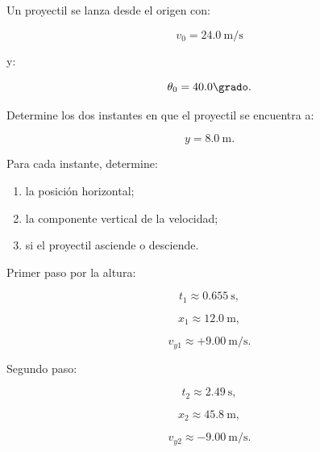 \begin{ejercicio}
Un proyectil se lanza desde el origen con:

\[
v_0=\SI{24.0}{\meter\per\second}
\]

y:

\[
\theta_0=40.0\grado.
\]

Determine los dos instantes en que el proyectil se encuentra a:

\[
y=\SI{8.0}{\meter}.
\]

Para cada instante, determine:

\begin{enumerate}[label=\alph*)]
    \item la posición horizontal;
    \item la componente vertical de la velocidad;
    \item si el proyectil asciende o desciende.
\end{enumerate}
\end{ejercicio}

\begin{respuesta}
Primer paso por la altura:

\[
t_1\approx\SI{0.655}{\second},
\]

\[
x_1\approx\SI{12.0}{\meter},
\]

\[
v_{y1}\approx+\SI{9.00}{\meter\per\second}.
\]

Segundo paso:

\[
t_2\approx\SI{2.49}{\second},
\]

\[
x_2\approx\SI{45.8}{\meter},
\]

\[
v_{y2}\approx-\SI{9.00}{\meter\per\second}.
\]
\end{respuesta}

